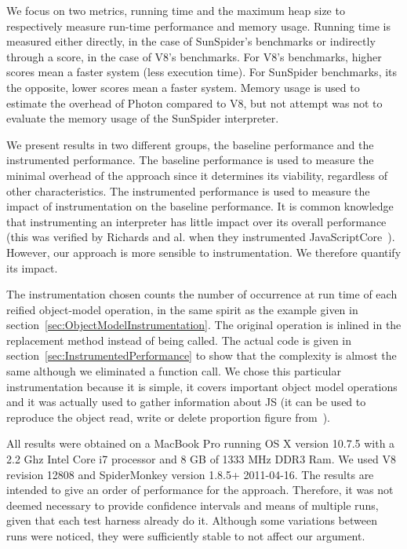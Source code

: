 We focus on two metrics, running time and the maximum heap size to respectively
measure run-time performance and memory usage. Running time is measured either
directly, in the case of SunSpider's benchmarks or indirectly through a score,
in the case of V8's benchmarks. For V8's benchmarks, higher scores mean a
faster system (less execution time). For SunSpider benchmarks, its the
opposite, lower scores mean a faster system.  Memory usage is used to estimate
the overhead of Photon compared to V8, but not attempt was not to evaluate the
memory usage of the SunSpider interpreter.

We present results in two different groups, the baseline performance and the
instrumented performance.  The baseline performance is used to measure the
minimal overhead of the approach since it determines its viability, regardless
of other characteristics.  The instrumented performance is used to measure the
impact of instrumentation on the baseline performance. It is common knowledge
that instrumenting an interpreter has little impact over its overall
performance (this was verified by Richards and al. when they instrumented
JavaScriptCore~\cite{behavior_js}).  However, our approach is more sensible to
instrumentation. We therefore quantify its impact. 

The instrumentation chosen counts the number of occurrence at run time of each
reified object-model operation, in the same spirit as the example given in
section~\ref{sec:ObjectModelInstrumentation}. The original operation is inlined
in the replacement method instead of being called. The actual code is given in
section~\ref{sec:InstrumentedPerformance} to show that the complexity is almost
the same although we eliminated a function call.  We chose this particular
instrumentation because it is simple, it covers important object model
operations and it was actually used to gather information about JS (it can be
used to reproduce the object read, write or delete proportion figure
from~\cite{behavior_js}).

All results were obtained on a MacBook Pro running OS X version 10.7.5 with a
2.2 Ghz Intel Core i7 processor and 8 GB of 1333 MHz DDR3 Ram. We used V8
revision 12808 and SpiderMonkey version 1.8.5+ 2011-04-16. The results are
intended to give an order of performance for the approach. Therefore, it was
not deemed necessary to provide confidence intervals and means of multiple
runs, given that each test harness already do it. Although some variations
between runs were noticed, they were sufficiently stable to not affect our
argument.

